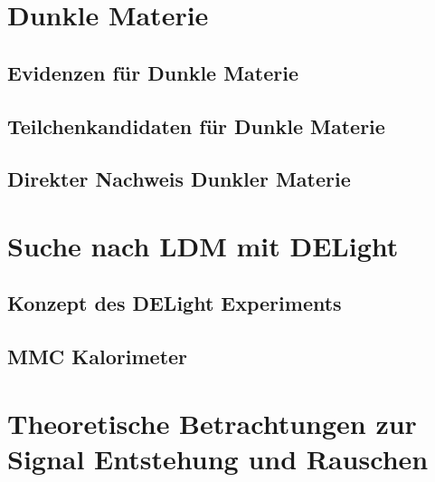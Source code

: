 \documentclass{include/thesisclass}
\begin{document}
    \FrontMatter

    
    

    \begingroup \let\clearpage\relax    %
    \tableofcontents                    %
    \endgroup
    \cleardoublepage



    \MainMatter

    
    
    \chapter{Dunkle Materie}
    \section{Evidenzen für Dunkle Materie}
    
    \section{Teilchenkandidaten für Dunkle Materie}
    
    \section{Direkter Nachweis Dunkler Materie}
    
    
	\chapter{Suche nach LDM mit DELight}
	
	\section{Konzept des DELight Experiments}
	  
	\section{MMC Kalorimeter}
	
	
	\chapter{Theoretische Betrachtungen zur Signal Entstehung und Rauschen}\label{sec:Entstehung}
	
\end{document}
